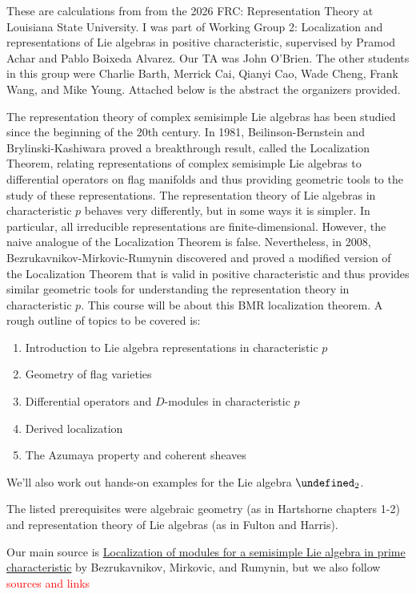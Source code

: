 \documentclass[11pt,leqno]{article}
\newcommand{\sai}[1]{\textcolor{red}{#1}}
\theoremstyle{plain}
\theoremstyle{definition}
\numberwithin{equation}{section}
\numberwithin{lem}{section}
\let\sl\undefined
\DeclareMathOperator{\sl}{\mathfrak{sl}}
\begin{document}
These are calculations from from the 2026 FRC: Representation Theory at Louisiana State University. I was part of Working Group 2: Localization and representations of Lie algebras in positive characteristic, supervised by Pramod Achar and Pablo Boixeda Alvarez. Our TA was John O'Brien. The other students in this group were Charlie Barth, Merrick Cai, Qianyi Cao, Wade Cheng, Frank Wang, and Mike Young. Attached below is the abstract the organizers provided.
\hrulefill

The representation theory of complex semisimple Lie algebras has been studied since the beginning of the 20th century. In 1981, Beilinson-Bernstein and Brylinski-Kashiwara proved a breakthrough result, called the Localization Theorem, relating representations of complex semisimple Lie algebras to differential operators on flag manifolds and thus providing geometric tools to the study of these representations. The representation theory of Lie algebras in characteristic $p$ behaves very differently, but in some ways it is simpler. In particular, all irreducible representations are finite-dimensional. However, the naive analogue of the Localization Theorem is false. Nevertheless, in 2008, Bezrukavnikov-Mirkovic-Rumynin discovered and proved a modified version of the Localization Theorem that is valid in positive characteristic and thus provides similar geometric tools for understanding the representation theory in characteristic $p$. This course will be about this BMR localization theorem. A rough outline of topics to be covered is:
\begin{enumerate}[label = \roman*.]
  \item Introduction to Lie algebra representations in characteristic $p$
  \item Geometry of flag varieties
  \item Differential operators and $D$-modules in characteristic $p$
  \item Derived localization
  \item The Azumaya property and coherent sheaves
\end{enumerate}
We'll also work out hands-on examples for the Lie algebra $\sl_2$.

\hrulefill

The listed prerequisites were algebraic geometry (as in Hartshorne chapters 1-2) and representation theory of Lie algebras (as in Fulton and Harris).

Our main source is \href{https://annals.math.princeton.edu/wp-content/uploads/annals-v167-n3-p05.pdf}{Localization of modules for a semisimple
Lie algebra in prime characteristic} by Bezrukavnikov, Mirkovic, and Rumynin, but we also follow \sai{sources and links}
\end{document}
